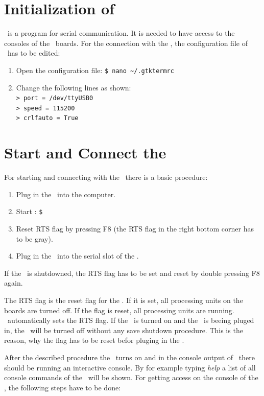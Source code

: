 \section{Initialization of \gtk}

\gtk\ is a program for serial communication. It is needed to have access to the consoles of the \amiro\ boards. For the connection with the \amiro, the configuration file of \gtk\ has to be edited:
\begin{enumerate}
\item Open the configuration file: {\tt\$ nano \textasciitilde/.gtktermrc}
\item Change the following lines as shown:\\
{\tt > port = /dev/ttyUSB0} \\
{\tt > speed = 115200} \\
{\tt > crlfauto = True}
\end{enumerate}

\section{Start and Connect the \amiro}

For starting and connecting with the \amiro\ there is a basic procedure:
\begin{enumerate}
\item Plug in the \progcable\ into the computer.
\item Start \gtk: {\tt\$ \gtkC}
\item Reset RTS flag by pressing F8 (the RTS flag in the right bottom corner has to be gray).
\item Plug in the \progcable\ into the serial slot of the \diwheel.
\end{enumerate}
If the \amiro\ is shutdowned, the RTS flag has to be set and reset by double pressing F8 again.

The RTS flag is the reset flag for the \amiro. If it is set, all processing units on the boards are turned off. If the flag is reset, all processing units are running. \gtk\ automatically sets the RTS flag. If the \amiro\ is turned on and the \progcable\ is beeing pluged in, the \amiro\ will be turned off without any save shutdown procedure. This is the reason, why the flag has to be reset befor pluging in the \progcable.

After the described procedure the \amiro\ turns on and in the console output of \gtk\ there should be running an interactive console. By for example typing {\it help} a list of all console commands of the \diwheel\ will be shown. For getting access on the console of the \cognition, the following steps have to be done:

